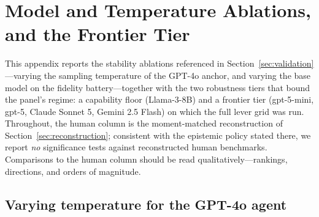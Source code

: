 \section{Model and Temperature Ablations, and the Frontier Tier}\label{app:ablations}

This appendix reports the stability ablations referenced in Section~\ref{sec:validation}---varying the sampling temperature of the GPT-4o anchor, and varying the base model on the fidelity battery---together with the two robustness tiers that bound the panel's regime: a capability floor (Llama-3-8B) and a frontier tier (gpt-5-mini, gpt-5, Claude Sonnet 5, Gemini 2.5 Flash) on which the full lever grid was run. Throughout, the human column is the moment-matched reconstruction of Section~\ref{sec:reconstruction}; consistent with the epistemic policy stated there, we report \emph{no} significance tests against reconstructed human benchmarks. Comparisons to the human column should be read qualitatively---rankings, directions, and orders of magnitude. 

\subsection{Varying temperature for the GPT-4o agent}

